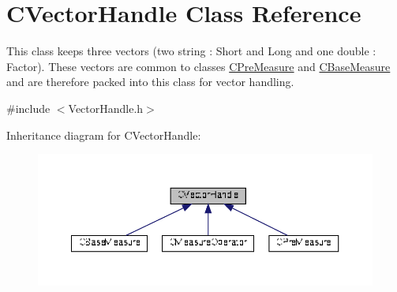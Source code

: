 \hypertarget{classCVectorHandle}{}\section{C\+Vector\+Handle Class Reference}
\label{classCVectorHandle}


This class keeps three vectors (two string \+: Short and Long and one double \+: Factor). These vectors are common to classes \hyperlink{classCPreMeasure}{C\+Pre\+Measure} and \hyperlink{classCBaseMeasure}{C\+Base\+Measure} and are therefore packed into this class for vector handling.  




{\ttfamily \#include $<$Vector\+Handle.\+h$>$}



Inheritance diagram for C\+Vector\+Handle\+:
\nopagebreak
\begin{figure}[H]
\begin{center}
\leavevmode
\includegraphics[width=350pt]{d7/d40/classCVectorHandle__inherit__graph}
\end{center}
\end{figure}
